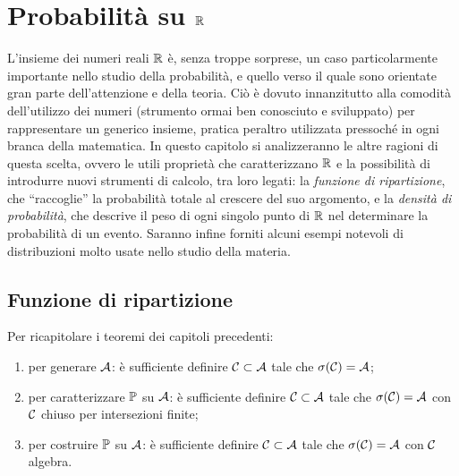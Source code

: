 
\section{Probabilità su $\mathbb R$}
L'insieme dei numeri reali $\mathbb R$ è, senza troppe sorprese, un caso particolarmente importante nello studio della probabilità, e quello verso il quale sono orientate gran parte dell'attenzione e della teoria.
Ciò è dovuto innanzitutto alla comodità dell'utilizzo dei numeri (strumento ormai ben conosciuto e sviluppato) per rappresentare un generico insieme, pratica peraltro utilizzata pressoché in ogni branca della matematica.
In questo capitolo si analizzeranno le altre ragioni di questa scelta, ovvero le utili proprietà che caratterizzano $\mathbb R$ e la possibilità di introdurre nuovi strumenti di calcolo, tra loro legati: la \emph{funzione di ripartizione}, che ``raccoglie'' la probabilità totale al crescere del suo argomento, e la \emph{densità di probabilità}, che descrive il peso di ogni singolo punto di $\mathbb R$ nel determinare la probabilità di un evento.
Saranno infine forniti alcuni esempi notevoli di distribuzioni molto usate nello studio della materia.

\subsection{Funzione di ripartizione}
Per ricapitolare i teoremi dei capitoli precedenti:
\begin{enumerate}
  \item per generare $\mathcal A$: è sufficiente definire $\mathcal C \subset \mathcal A$ tale che $\sigma(\mathcal C) = \mathcal A$;
  \item per caratterizzare $\mathbb P$ su $\mathcal A$: è sufficiente definire $\mathcal C \subset \mathcal A$ tale che $\sigma(\mathcal C) = \mathcal A $ con $ \mathcal C$ chiuso per intersezioni finite;
  \item per costruire $\mathbb P$ su $\mathcal A$: è sufficiente definire $\mathcal C \subset \mathcal A$ tale che $\sigma(\mathcal C) = \mathcal A$ con $\mathcal C$ algebra.
\end{enumerate}

